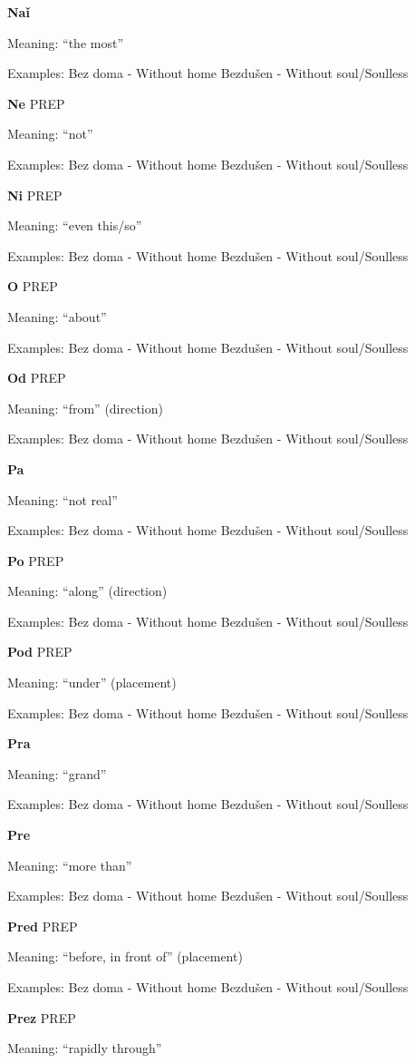 \textbf{Naǐ}

Meaning: “the most”

Examples:
Bez doma - Without home
Bezdušen - Without soul/Soulless 


\textbf{Ne} PREP

Meaning: “not”

Examples:
Bez doma - Without home
Bezdušen - Without soul/Soulless 

\textbf{Ni} PREP

Meaning: “even this/so”

Examples:
Bez doma - Without home
Bezdušen - Without soul/Soulless 

\textbf{O}  PREP

Meaning: “about”

Examples:
Bez doma - Without home
Bezdušen - Without soul/Soulless 

\textbf{Od} PREP

Meaning: “from” (direction)

Examples:
Bez doma - Without home
Bezdušen - Without soul/Soulless 

\textbf{Pa}

Meaning: “not real”

Examples:
Bez doma - Without home
Bezdušen - Without soul/Soulless 


\textbf{Po} PREP

Meaning: “along” (direction)

Examples:
Bez doma - Without home
Bezdušen - Without soul/Soulless 

\textbf{Pod} PREP

Meaning: “under” (placement)

Examples:
Bez doma - Without home
Bezdušen - Without soul/Soulless 

\textbf{Pra}

Meaning: “grand”

Examples:
Bez doma - Without home
Bezdušen - Without soul/Soulless 

\textbf{Pre}

Meaning: “more than”

Examples:
Bez doma - Without home
Bezdušen - Without soul/Soulless 

\textbf{Pred} PREP

Meaning: “before, in front of” (placement)

Examples:
Bez doma - Without home
Bezdušen - Without soul/Soulless 

\textbf{Prez} PREP

Meaning: “rapidly through”

